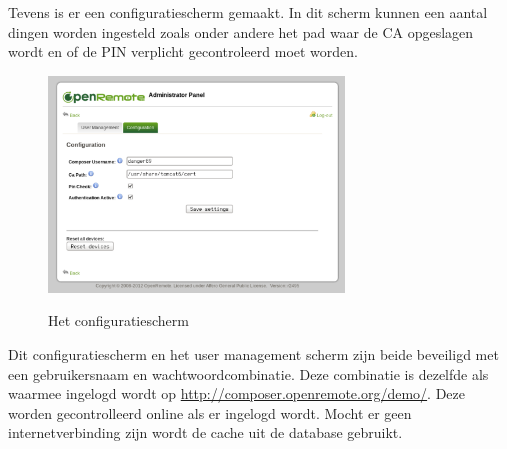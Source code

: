 \documentclass[]{article}
\begin{document}
Tevens is er een
configuratiescherm gemaakt. In dit scherm kunnen een aantal dingen worden
ingesteld zoals onder andere het pad waar de CA opgeslagen wordt en of de PIN
verplicht gecontroleerd moet worden.

\begin{figure}[h!]
  \centering
    \includegraphics[width=0.7\textwidth,keepaspectratio]{adminv2config.pdf}
  \label{fig:adminv2config}
  \caption{Het configuratiescherm}
\end{figure}

Dit configuratiescherm en het user management scherm zijn beide beveiligd met
een gebruikersnaam en wachtwoordcombinatie. Deze combinatie is dezelfde als
waarmee ingelogd wordt op \url{http://composer.openremote.org/demo/}. 
Deze worden gecontrolleerd online als er ingelogd wordt. Mocht er geen
internetverbinding zijn wordt de cache uit de database gebruikt.
\end{document}
